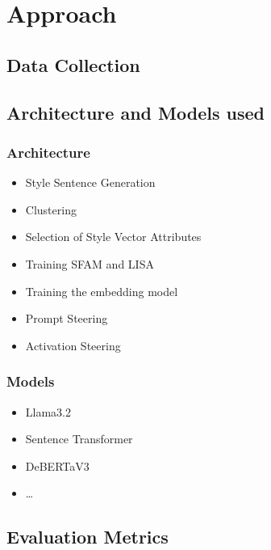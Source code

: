 \chapter{Approach}
\label{sec:approach}


\section{Data Collection}
\label{sec:approach:dataCollection}


\section{Architecture and Models used}
\label{sec:approach:architectureModels}

\subsection{Architecture}
\label{sec:approach:architectureModels:architecture}

\begin{itemize}
  \item Style Sentence Generation
  \item Clustering
  \item Selection of Style Vector Attributes
  \item Training SFAM and LISA
  \item Training the embedding model
  \item Prompt Steering
  \item Activation Steering
\end{itemize}

\subsection{Models}
\label{sec:approach:architectureModels:models}

\begin{itemize}
  \item Llama3.2
  \item Sentence Transformer
  \item DeBERTaV3
  \item \ldots
\end{itemize}


\section{Evaluation Metrics}
\label{sec:approach:evaluationMetrics}

